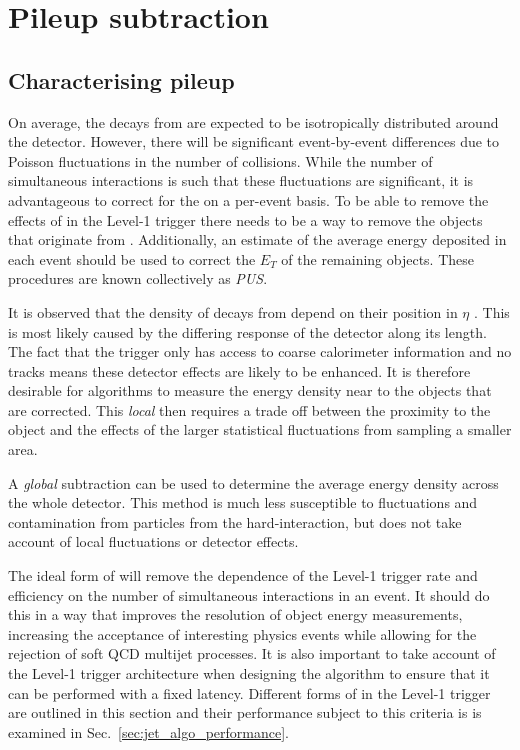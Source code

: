 \section{Pileup subtraction}
\label{sec:pus}

\subsection{Characterising pileup}
 
On average, the decays from \PU are expected to be isotropically
distributed around the detector. However, there will be significant
event-by-event differences due to Poisson fluctuations in the number
of \PU collisions. While the number of simultaneous interactions is
such that these fluctuations are significant, it is advantageous to
correct for the \PU on a per-event basis. To be able to remove the
effects of \PU in the Level-1 trigger there needs to be a way to remove
the objects that originate from \PU. Additionally, an
estimate of the average energy deposited in each event should be used
to correct the $E_T$ of the remaining objects. These procedures are
known collectively as \emph{\acf{PUS}}.

It is observed that the density of decays from \PU 
depend on their position in $\eta$ \cite{Cacciari2011}. This is
most likely caused by the differing response of the detector along its
length. The fact that the trigger only has access to
coarse calorimeter information and no tracks means these detector
effects are likely to be enhanced. It is therefore desirable for \PUS
algorithms to measure the \PU energy density near to the objects that
are corrected. This \emph{local} \PUS then requires a trade off
between the proximity to the object and the effects of the
larger statistical fluctuations from sampling a smaller area. 

A \emph{global} subtraction can be used to determine the average
energy density across the whole detector. This method is much less
susceptible to fluctuations and contamination from particles from the
hard-interaction, but does not take account of local fluctuations or
detector effects.

The ideal form of \PUS will remove the dependence of the Level-1
trigger rate and efficiency on the number of simultaneous interactions
in an event. It should do this in a way that improves the resolution
of object energy measurements, increasing the acceptance
of interesting physics events while allowing for the rejection of soft
QCD multijet processes. It is also important to take account of the
Level-1 trigger architecture when designing the algorithm to ensure
that it can be performed with a fixed latency. Different forms of \PUS
in the Level-1 trigger are outlined in this section and their
performance subject to this criteria is is examined in
Sec.~\ref{sec:jet_algo_performance}. 

